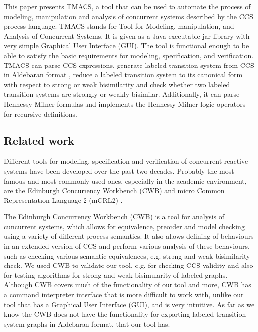 This paper presents TMACS, a tool that can be used to automate the process of modeling, manipulation and analysis of concurrent systems described by the CCS process language. TMACS stands for Tool for Modeling, manipulation, and Analysis of Concurrent Systems. It is given as a Java executable jar library \cite{Jar} with very simple Graphical User Interface (GUI). The tool is functional enough to be able to satisfy the basic requirements for modeling, specification, and verification. TMACS can parse CCS expressions, generate labeled transition system from CCS in Aldebaran format \cite{Aldebaran}, reduce a labeled transition system to its canonical form with respect to strong or weak bisimilarity and check whether two labeled transition systems are strongly or weakly bisimilar. Additionally, it can parse Hennessy-Milner formulas and implements the Hennessy-Milner logic operators for recursive definitions.

\subsection{Related work} 

Different tools for modeling, specification and verification of concurrent reactive systems have been developed over the past two decades. Probably the most famous and most commonly used ones, especially in the academic environment, are the Edinburgh Concurrency Workbench (CWB) \cite{CWB} and micro Common Representation Language 2 (mCRL2) \cite{mCRL2}. 

The Edinburgh Concurrency Workbench (CWB) is a tool for analysis of cuncurrent systems, which allows for equivalence, preorder and model checking using a variety of different process semantics. It also allows defining of behaviours in an extended version of CCS and perform various analysis of these behaviours, such as checking various semantic equivalences, e.g. strong and weak bisimilarity check. We used CWB to validate our tool, e.g. for checking CCS validity and also for testing algorithms for strong and weak bisimularity of labeled graphs. Although CWB covers much of the functionality of our tool and more, CWB has a command interpreter interface that is more difficult to work with, unlike our tool that has a Graphical User Interface (GUI), and is very intuitive. As far as we know the CWB does not have the functionality for exporting labeled transition system graphs in Aldebaran format, that our tool has. 

